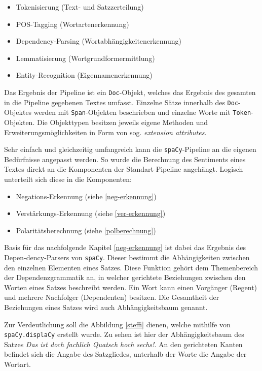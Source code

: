 \begin{itemize}
\item Tokenisierung (Text- und Satzzerteilung)
\item POS-Tagging (Wortartenerkennung)
\item Dependency-Parsing (Wortabhängigkeitenerkennung)
\item Lemmatisierung (Wortgrundformermittlung)
\item Entity-Recognition (Eigennamenerkennung)
\end{itemize}

Das Ergebnis der Pipeline ist ein \texttt{Doc}-Objekt, welches das Ergebnis des gesamten in die Pipeline gegebenen Textes umfasst. 
Einzelne Sätze innerhalb des \texttt{Doc}-Objektes werden mit \texttt{Span}-Objekten beschrieben und einzelne Worte mit \texttt{Token}-Objekten. 
Die Objekttypen besitzen jeweils eigene Methoden und Erweiterungsmöglichkeiten in Form von sog. \textit{extension attributes}. 

Sehr einfach und gleichzeitig umfangreich kann die \texttt{spaCy}-Pipeline an die eigenen Bedürfnisse angepasst werden. 
So wurde die Berechnung des Sentiments eines Textes direkt an die Komponenten der Standart-Pipeline angehängt. 
Logisch unterteilt sich diese in die Komponenten:

\begin{itemize}
\item Negations-Erkennung (siehe \ref{neg-erkennung})
\item Verstärkungs-Erkennung (siehe \ref{ver-erkennung})
\item Polaritätsberechnung (siehe \ref{polberechnung})
\end{itemize}

Basis für das nachfolgende Kapitel \ref{neg-erkennung} ist dabei das Ergebnis des Depen-dency-Parsers von \texttt{spaCy}. 
Dieser bestimmt die Abhängigkeiten zwischen den einzelnen Elementen eines Satzes. 
Diese Funktion gehört dem Themenbereich der Dependenzgrammatik an, in welcher gerichtete Beziehungen zwischen den Worten eines Satzes beschreibt werden. 
Ein Wort kann einen Vorgänger (Regent) und mehrere Nachfolger (Dependenten) besitzen. 
Die Gesamtheit der Beziehungen eines Satzes wird auch Abhängigkeitsbaum genannt. 

Zur Verdeutlichung soll die Abbildung \ref{steffi} dienen, welche mithilfe von \texttt{spaCy.displaCy} erstellt wurde. 
Zu sehen ist hier der Abhängigkeitsbaum des Satzes \textit{\glqq Das ist doch fachlich Quatsch hoch sechs!\grqq}. 
An den gerichteten Kanten befindet sich die Angabe des Satzgliedes, unterhalb der Worte die Angabe der Wortart. 

